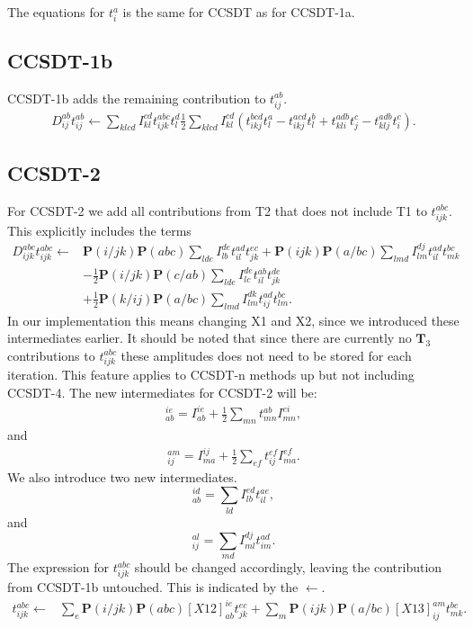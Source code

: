 \documentclass[graybox,sectrefs,envcountresetchap,open=right]{svmonodo}
\begin{document}
The equations for $t_i^a$ is the same for CCSDT as for CCSDT-1a. 

\subsection{CCSDT-1b}
CCSDT-1b adds the remaining contribution to $t_{ij}^{ab}$. 
\begin{align}
D_{ij}^{ab} t_{ij}^{ab} \leftarrow
\sum_{klcd} I_{kl}^{cd} t_{ijk}^{abc} t_l^d  \frac{1}{2} \sum_{klcd} I_{kl}^{cd} \left(
 t_{ikj}^{bcd} t_l^a - t_{ikj}^{acd} t_l^b 
 + t_{kli}^{adb} t_j^c - t_{klj}^{adb} t_i^c \right) .
\end{align}
\subsection{CCSDT-2}
For CCSDT-2 we add all contributions from T2 that does not include T1 to $t_{ijk}^{abc}$. This explicitly includes the terms
\begin{align}
D_{ijk}^{abc} t_{ijk}^{abc} \leftarrow & 
\mathbf{P}(i/jk) \mathbf{P}(abc) \sum_{lde} I_{lb}^{de} t_{il}^{ad} t_{jk}^{ec}
+ \mathbf{P}(ijk) \mathbf{P}(a/bc) \sum_{lmd} I_{lm}^{dj} t_{il}^{ad} t_{mk}^{bc} \nonumber \\ &
- \frac{1}{2} \mathbf{P}(i/jk) \mathbf{P}(c/ab) \sum_{lde} I_{lc}^{de} t_{il}^{ab} t_{jk}^{de} \nonumber \\ & 
 + \frac{1}{2} \mathbf{P}(k/ij) \mathbf{P}(a/bc) \sum_{lmd} I_{lm}^{dk} t_{ij}^{ad} t_{lm}^{bc}  .
\end{align}
In our implementation this means changing X1 and X2, since we introduced these intermediates earlier. It should be noted that since there are currently no $\mathbf{T}_3$ contributions to $t_{ijk}^{abc}$ these amplitudes does not need to be stored for each iteration. This feature applies to CCSDT-n methods up but not including CCSDT-4. The new intermediates for CCSDT-2 will be:
\begin{align}
[X1]_{ab}^{ie} = I_{ab}^{ie} +
\frac{1}{2} \sum_{mn} t_{mn}^{ab} I_{mn}^{ei} ,
\end{align}
and
\begin{align}
[X2]_{ij}^{am} = I_{ma}^{ij} + \frac{1}{2} \sum_{ef} t_{ij}^{ef} I_{ma}^{ef}  .
\end{align}
We also introduce two new intermediates.
\begin{equation}
[X12]_{ab}^{id} = \sum_{ld} I_{lb}^{ed} t_{il}^{ae} ,
\end{equation}
and
\begin{equation}
[X13]_{ij}^{al} = \sum_{md} I_{ml}^{dj} t^{ad}_{im} .
\end{equation}
The expression for $t_{ijk}^{abc}$ should be changed accordingly, leaving the contribution from CCSDT-1b untouched. This is indicated by the $\leftarrow$. 
\begin{align}
t_{ijk}^{abc} \leftarrow &
\sum_e \mathbf{P}(i/jk) \mathbf{P}(abc) [X12]_{ab}^{ie} t_{jk}^{ec}
+ \sum_m \mathbf{P} (ijk) \mathbf{P}(a/bc) [X13]_{ij}^{am} t_{mk}^{bc} .
\end{align}
\end{document}
